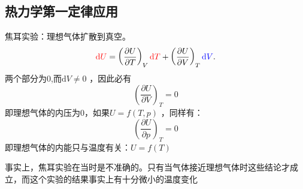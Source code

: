 \subsection{热力学第一定律应用}%
\label{sub:热力学第一定律应用}
\begin{notation}
    焦耳实验：理想气体扩散到真空。
    \[
        \textcolor{red}{\mathrm{d}U} = \left(\frac{\partial U}{\partial T}\right)_{V}\textcolor{red}{\mathrm{d}T} + \left(\frac{\partial U}{\partial V}\right)_{T}\textcolor{blue}{\mathrm{d}V}
    .\]
    两个部分为0,而$\mathrm{d}V \neq 0$ ，因此必有
    \begin{equation}
        \label{eq:焦耳实验内压}
        \left(\frac{\partial U}{\partial V}\right)_{T}=0
    \end{equation}
    即理想气体的内压为0，如果$U = f\left( T,p \right)$ ，同样有：
    \begin{equation}
        \label{eq:焦耳实验热效应}
        \left(\frac{\partial U}{\partial p}\right)_{T} = 0
    \end{equation}
    即理想气体的内能只与温度有关：$U = f\left( T \right)$

    事实上，焦耳实验在当时是不准确的。只有当气体接近理想气体时这些结论才成立，而这个实验的结果事实上有十分微小的温度变化
\end{notation}
